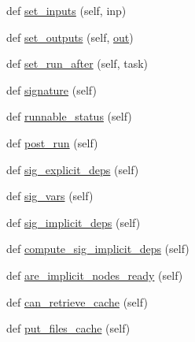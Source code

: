 \begin{DoxyCompactItemize}
\item 
def \hyperlink{classwaflib_1_1_task_1_1_task_a647c971bbca84d07daeff8d24f70ea18}{set\+\_\+inputs} (self, inp)
\item 
def \hyperlink{classwaflib_1_1_task_1_1_task_a8e650ed64c8370720574ebd8481a4f48}{set\+\_\+outputs} (self, \hyperlink{latency_8c_a71fd1c281affec034757279e4f91c50b}{out})
\item 
def \hyperlink{classwaflib_1_1_task_1_1_task_a84292828c5a6cf3282027ed8ce5c7822}{set\+\_\+run\+\_\+after} (self, task)
\item 
def \hyperlink{classwaflib_1_1_task_1_1_task_a48e55f13de8172b779a4e63794c7f44f}{signature} (self)
\item 
def \hyperlink{classwaflib_1_1_task_1_1_task_a2a281aaea77a0732f72103cfe4bc56c4}{runnable\+\_\+status} (self)
\item 
def \hyperlink{classwaflib_1_1_task_1_1_task_ac7c2e0bf22acd7d96399b1ca7f342232}{post\+\_\+run} (self)
\item 
def \hyperlink{classwaflib_1_1_task_1_1_task_a76a53025fb59fd6096f988ff64481070}{sig\+\_\+explicit\+\_\+deps} (self)
\item 
def \hyperlink{classwaflib_1_1_task_1_1_task_acffd01af005b390787b85239ac207282}{sig\+\_\+vars} (self)
\item 
def \hyperlink{classwaflib_1_1_task_1_1_task_a60ce159ef323481b09fcea4decb9e231}{sig\+\_\+implicit\+\_\+deps} (self)
\item 
def \hyperlink{classwaflib_1_1_task_1_1_task_adf3f63ea77fbca592ebc4244ba57887d}{compute\+\_\+sig\+\_\+implicit\+\_\+deps} (self)
\item 
def \hyperlink{classwaflib_1_1_task_1_1_task_a89612661d2073f53f62d7306a6c2238d}{are\+\_\+implicit\+\_\+nodes\+\_\+ready} (self)
\item 
def \hyperlink{classwaflib_1_1_task_1_1_task_a2085cfed25d49bed519af381621b29e7}{can\+\_\+retrieve\+\_\+cache} (self)
\item 
def \hyperlink{classwaflib_1_1_task_1_1_task_adf5e108580503738b2ab58eb1b56c10f}{put\+\_\+files\+\_\+cache} (self)
\end{DoxyCompactItemize}
